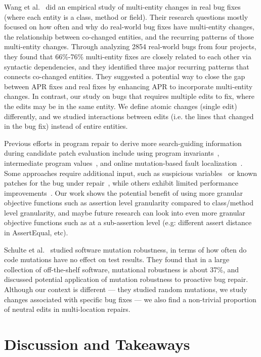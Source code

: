 \documentclass[10pt, conference]{IEEEtran}
\begin{document}
Wang et al.~\cite{wang2018} did an empirical study of multi-entity changes in real bug fixes 
(where each entity is a class, method or field). Their research questions mostly focused on 
how often and why do real-world bug fixes have multi-entity changes, the relationship 
between co-changed entities, and the recurring patterns of those multi-entity changes. 
Through analyzing 2854 real-world bugs from four projects, they found that 66\%-76\% 
multi-entity fixes are closely related to each other via syntactic dependencies, 
and they identified three major recurring patterns that connects co-changed entities. 
They suggested a potential way to close the gap between APR fixes and real fixes by 
enhancing APR to incorporate multi-entity changes. In contrast, our study on bugs that
requires multiple edits to fix, where the edits may be in the same entity. We define atomic 
changes (single edit) differently, and we studied interactions between edits 
(i.e. the lines that changed in the bug fix) instead of entire entities.

Previous efforts in program repair to derive more search-guiding information 
during candidate patch evaluation 
include using program invariants~\cite{better-fitness, dinglyu}, 
intermediate program values~\cite{source-code-checkpoint}, 
and online mutation-based fault localization~\cite{mut-analysis}.
Some approaches require additional input, such as suspicious variables~\cite{source-code-checkpoint} 
or known patches for the bug under repair~\cite{better-fitness}, 
while others exhibit limited performance improvements~\cite{dinglyu, mut-analysis}.
Our work shows the potential benefit of using more granular objective functions such as
assertion level granularity compared to class/method level granularity, and maybe
future research can look into even more granular objective functions such as at a sub-assertion
level (e.g: different assert distance in AssertEqual, etc).

Schulte et al.~\cite{schulte} studied software mutation robustness, in terms of 
how often do code mutations have no effect on test results.
They found that in a large collection of off-the-shelf software, mutational robustness is about 37\%, 
and discussed potential application of mutation robustness to proactive bug repair. Although our context is different --- they studied random mutations, we study changes associated with specific bug fixes --- we also find a non-trivial proportion of neutral edits in multi-location repairs.  


\section{Discussion and Takeaways}
\label{sec:takeaways}
\end{document}
